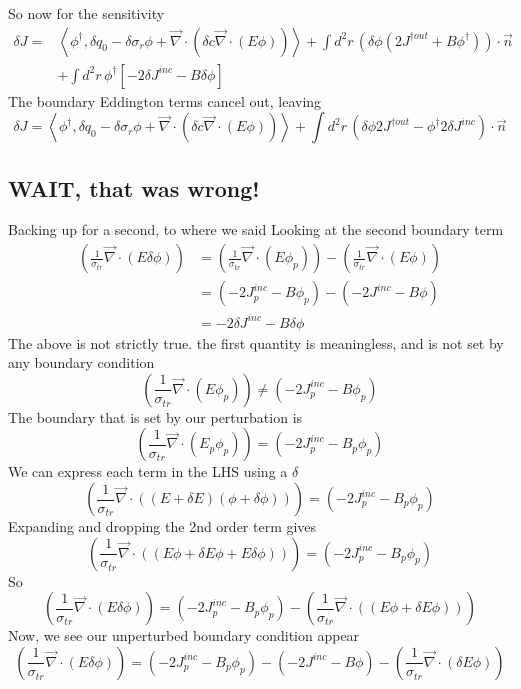 \documentclass{article}
\newcommand{\bra}{\left\langle}
\newcommand{\ket}{\right\rangle}
\newcommand{\vdiv}{\vec{\nabla} \cdot}
\begin{document}
So now for the sensitivity
\begin{align*}
\delta J =& \bra \phi^\dag , \delta q_0 - \delta \sigma_r \phi + \vdiv \left( \delta c \vdiv \left( E \phi \right) \right)  \ket + \int d^2 r \, \left(\delta \phi \left( 2J^{ \dag out } + B \phi^\dag \right) \right) \cdot \vec{n} \\
&+ \int d^2 r \, \phi^\dag \left[ -2\delta J^{inc} -B \delta \phi \right]
\end{align*}
The boundary Eddington terms cancel out, leaving
\[
\delta J = \bra \phi^\dag , \delta q_0 - \delta \sigma_r \phi + \vdiv \left( \delta c \vdiv \left( E \phi \right) \right)  \ket + \int d^2 r \, \left(  \delta \phi 2J^{ \dag out }  - \phi^\dag 2\delta J^{inc} \right) \cdot \vec{n} 
\]

\subsection{WAIT, that was wrong!}
Backing up for a second, to where we said
Looking at the second boundary term
\begin{align*}
\left( \frac{1}{\sigma_{tr}} \vdiv \left( E \delta \phi \right) \right) 
& = \left( \frac{1}{\sigma_{tr}} \vdiv \left( E \phi_p \right) \right) - \left( \frac{1}{\sigma_{tr}} \vdiv \left( E \phi \right) \right) \\
&= (-2J_p^{inc} - B \phi_p) - (-2J^{inc} - B \phi) \\
&= -2\delta J^{inc} -B \delta \phi
\end{align*}
The above is not strictly true. the first quantity is meaningless, and is not set by any boundary condition
\[
\left( \frac{1}{\sigma_{tr}} \vdiv \left( E \phi_p \right) \right) \neq (-2J_p^{inc} - B \phi_p)
\]
The boundary that is set by our perturbation is
\[
\left( \frac{1}{\sigma_{tr}} \vdiv \left( E_p \phi_p \right) \right) = (-2J_p^{inc} - B_p \phi_p)
\]
We can express each term in the LHS using a $\delta$
\[
\left( \frac{1}{\sigma_{tr}} \vdiv \left( (E+ \delta E) (\phi + \delta \phi) \right) \right) = (-2J_p^{inc} - B_p \phi_p)
\]
Expanding and dropping the 2nd order term gives
\[
\left( \frac{1}{\sigma_{tr}} \vdiv \left( (E \phi + \delta E \phi + E \delta \phi) \right) \right) = (-2J_p^{inc} - B_p \phi_p)
\]
So
\[
\left( \frac{1}{\sigma_{tr}} \vdiv \left(  E \delta \phi \right) \right) = (-2J_p^{inc} - B_p \phi_p) - \left( \frac{1}{\sigma_{tr}} \vdiv \left( (E \phi + \delta E \phi ) \right) \right)
\]
Now, we see our unperturbed boundary condition appear
\[
\left( \frac{1}{\sigma_{tr}} \vdiv \left(  E \delta \phi \right) \right) = (-2J_p^{inc} - B_p \phi_p) - (-2J^{inc} - B \phi)  - \left( \frac{1}{\sigma_{tr}} \vdiv \left( \delta E \phi  \right) \right)
\]
\end{document}
